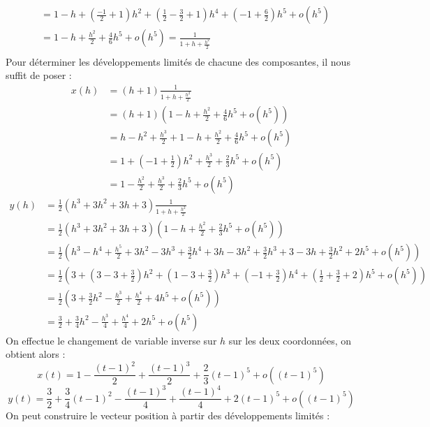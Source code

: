 \begin{ex}
\begin{align*}
     &=1-h+\left(\frac{-1}{2}+1\right)h^2+\left(\frac{1}{2}-\frac{3}{2}+1\right)h^4+\left(-1+\frac{6}{2}\right)h^5+o(h^5)\\
     &=1-h+\frac{h^2}{2}+\frac{4}{6}h^5+o(h^5)=\frac{1}{1+h+\frac{h^2}{2}}\\
\end{align*}
Pour déterminer les développements limités de chacune des composantes, il nous suffit de poser :
\begin{align*}
    x(h)&=(h+1)\frac{1}{1+h+\frac{h^2}{2}}\\
    &=(h+1)\left(1-h+\frac{h^2}{2}+\frac{4}{6}h^5+o(h^5)\right)\\
    &=h-h^2+\frac{h^3}{2}+1-h+\frac{h^2}{2}+\frac{4}{6}h^5+o(h^5)\\
    &=1+\left(-1+\frac{1}{2}\right)h^2+\frac{h^3}{2}+\frac{2}{3}h^5+o(h^5)\\
    &=1-\frac{h^2}{2}+\frac{h^3}{2}+\frac{2}{3}h^5+o(h^5)
\end{align*}
\begin{align*}
    y(h)&=\frac{1}{2}\left(h^3+3h^2+3h+3\right)\frac{1}{1+h+\frac{h^2}{2}}\\
    &=\frac{1}{2}\left(h^3+3h^2+3h+3\right)\left(1-h+\frac{h^2}{2}+\frac{2}{3}h^5+o(h^5)\right)\\
    &=\frac{1}{2}\left(h^3-h^4+\frac{h^5}{2}+3h^2-3h^3+\frac{3}{2}h^4+3h-3h^2+\frac{3}{2}h^3+3-3h+\frac{3}{2}h^2+2h^5+o(h^5)\right)\\
    &=\frac{1}{2}\left(3+\left(3-3+\frac{3}{2}\right)h^2+\left(1-3+\frac{3}{2}\right)h^3+\left(-1+\frac{3}{2}\right)h^4+\left(\frac{1}{2}+\frac{3}{2}+2\right)h^5+o(h^5)\right)\\
    &=\frac{1}{2}\left(3+\frac{3}{2}h^2-\frac{h^3}{2}+\frac{h^4}{2}+4h^5+o(h^5)\right)\\
    &=\frac{3}{2}+\frac{3}{4}h^2-\frac{h^3}{4}+\frac{h^4}{4}+2h^5+o(h^5)
\end{align*}
On effectue le changement de variable inverse sur $h$ sur les deux coordonnées, on obtient alors :
$$x(t)=1-\frac{(t-1)^2}{2}+\frac{(t-1)^3}{2}+\frac{2}{3}(t-1)^5+o((t-1)^5)$$
$$y(t)=\frac{3}{2}+\frac{3}{4}(t-1)^2-\frac{(t-1)^3}{4}+\frac{(t-1)^4}{4}+2(t-1)^5+o((t-1)^5)$$
On peut construire le vecteur position à partir des développements limités :


\end{ex}
